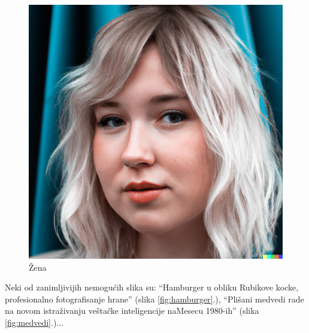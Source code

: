 \documentclass[a4paper]{article}
\begin{document}
\begin{nesto1}
\begin{figure}[h!]
\begin{center}
\includegraphics[scale=0.10]{zena.jpg}
\end{center}
\caption{Žena}
\label{fig:zena}
\end{figure}
\newpage

Neki od zanimljivijih nemogućih slika su: “Hamburger u obliku Rubikove kocke, profesionalno fotografisanje hrane” (slika \ref{fig:hamburger}.), “Plišani medvedi rade na novom istraživanju veštačke inteligencije naMesecu 1980-ih” (slika \ref{fig:medvedi}.)...


\end{nesto1}
\end{document}
